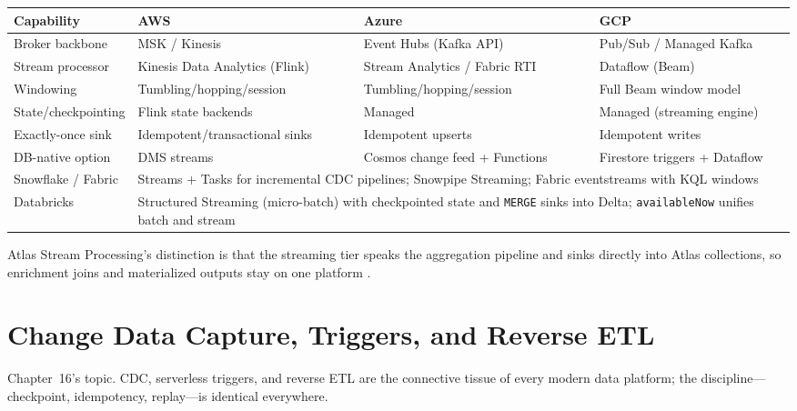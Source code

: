 \begin{center}
\footnotesize
\begin{tabular}{@{}p{2.9cm}p{3.0cm}p{3.0cm}p{3.0cm}@{}}
\toprule
\textbf{Capability} & \textbf{AWS} & \textbf{Azure} & \textbf{GCP} \\
\midrule
Broker backbone & MSK / Kinesis & Event Hubs (Kafka API) & Pub/Sub / Managed Kafka \\
Stream processor & Kinesis Data Analytics (Flink) & Stream Analytics / Fabric RTI & Dataflow (Beam) \\
Windowing & Tumbling/hopping/session & Tumbling/hopping/session & Full Beam window model \\
State/checkpointing & Flink state backends & Managed & Managed (streaming engine) \\
Exactly-once sink & Idempotent/transactional sinks & Idempotent upserts & Idempotent writes \\
DB-native option & DMS streams & Cosmos change feed + Functions & Firestore triggers + Dataflow \\
\addlinespace
Snowflake / Fabric & \multicolumn{3}{l}{Streams + Tasks for incremental CDC pipelines; Snowpipe Streaming; Fabric eventstreams with KQL windows} \\
Databricks & \multicolumn{3}{l}{Structured Streaming (micro-batch) with checkpointed state and \texttt{MERGE} sinks into Delta; \texttt{availableNow} unifies batch and stream} \\
\bottomrule
\end{tabular}
\end{center}

\noindent Atlas Stream Processing's distinction is that the streaming tier speaks the aggregation
pipeline and sinks directly into Atlas collections, so enrichment joins and materialized outputs
stay on one platform \cite{mongodbStreamProcessingDocs,apacheKafkaRepo}.

\section{Change Data Capture, Triggers, and Reverse ETL}
%
Chapter~16's topic. CDC, serverless triggers, and reverse ETL are the connective tissue of every
modern data platform; the discipline---checkpoint, idempotency, replay---is identical everywhere.

